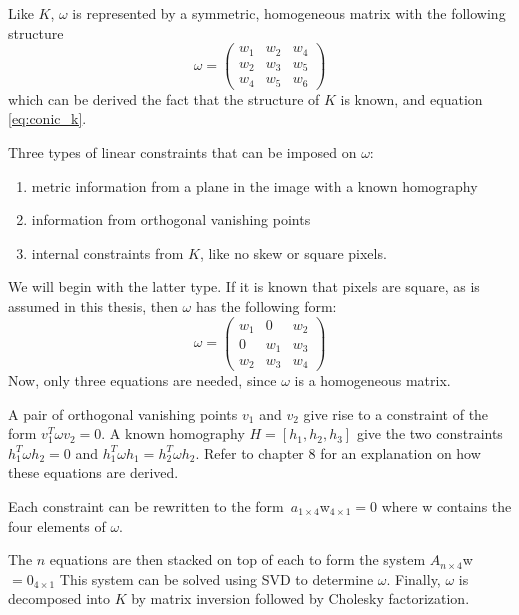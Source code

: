 Like $K$, $\omega$ is represented by a symmetric, homogeneous matrix with the following structure
$$
\omega = \begin{pmatrix}
	w_{1} & w_{2} & w_{4} \\
	w_{2} & w_{3} & w_{5} \\
	w_{4} & w_{5} & w_{6} 
\end{pmatrix}
$$
which can be derived the fact that the structure of $K$ is known, and equation \ref{eq:conic_k}.

Three types of linear constraints that can be imposed on $\omega$:
\begin{enumerate}
	\item metric information from a plane in the image with a known homography
	\item information from orthogonal vanishing points
	\item internal constraints from $K$, like no skew or square pixels.
\end{enumerate}

We will begin with the latter type.
If it is known that pixels are square, as is assumed in this thesis, then $\omega$ has the following form:
$$
\omega = \begin{pmatrix}
	w_{1} & 0 & w_{2} \\
	0 & w_{1} & w_{3} \\
	w_{2} & w_{3} & w_{4}
\end{pmatrix}
$$
Now, only three equations are needed, since $\omega$ is a homogeneous matrix.

A pair of orthogonal vanishing points $v_1$ and $v_2$ give rise to a constraint of the form $v_{1}^T \omega v_{2} = 0$.
A known homography $H=[h_{1},h_{2},h_{3}]$ give the two constraints $h_{1}^T \omega h_{2} = 0$ and $h_{1}^T \omega h_{1} = h_{2}^T \omega h_{2}$. Refer to \cite{hartley-zisserman} chapter 8 for an explanation on how these equations are derived.

Each constraint can be rewritten to the form $a_{1 \times 4}$w$_{4 \times 1}=0$ where w contains the four elements of $\omega$.

The $n$ equations are then stacked on top of each to form the system $A_{n \times 4}$w$=0_{4 \times 1}$
This system can be solved using SVD to determine $\omega$.
Finally, $\omega$ is decomposed into $K$ by matrix inversion followed by Cholesky factorization. \cite[223-226]{hartley-zisserman}

